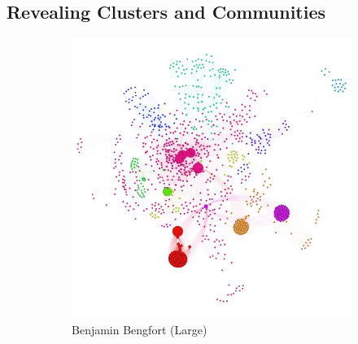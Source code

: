 \documentclass[11pt,letterpaper]{article}
\begin{document}
\subsection*{Revealing Clusters and Communities}

\begin{figure}[h]
	\centering
	\begin{subfigure}{0.49\textwidth}
		\centering
		\includegraphics[width=\textwidth]{figures/benjamin_cluster.png}
		\caption{\textsf{Benjamin Bengfort (Large)}}
        \label{fig:benjamin_cluster}
	\end{subfigure} \hfill
	\begin{subfigure}{0.49\textwidth}
		\centering

\end{subfigure}
\end{figure}
\end{document}
